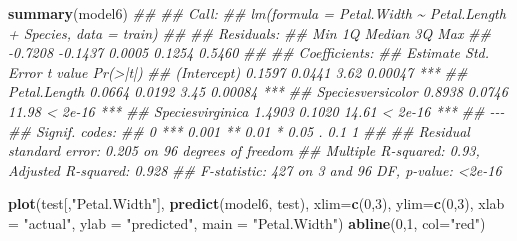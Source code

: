 \documentclass[
  notitlepage]{book}
\newenvironment{Shaded}{\begin{snugshade}}{\end{snugshade}}
\newcommand{\CommentTok}[1]{\textcolor[rgb]{0.56,0.35,0.01}{\textit{#1}}}
\newcommand{\DataTypeTok}[1]{\textcolor[rgb]{0.13,0.29,0.53}{#1}}
\newcommand{\DecValTok}[1]{\textcolor[rgb]{0.00,0.00,0.81}{#1}}
\newcommand{\KeywordTok}[1]{\textcolor[rgb]{0.13,0.29,0.53}{\textbf{#1}}}
\newcommand{\NormalTok}[1]{#1}
\newcommand{\OperatorTok}[1]{\textcolor[rgb]{0.81,0.36,0.00}{\textbf{#1}}}
\newcommand{\StringTok}[1]{\textcolor[rgb]{0.31,0.60,0.02}{#1}}
\begin{document}
\begin{Shaded}
\begin{Highlighting}[]
\KeywordTok{summary}\NormalTok{(model6)}
\CommentTok{\#\# }
\CommentTok{\#\# Call:}
\CommentTok{\#\# lm(formula = Petal.Width \textasciitilde{} Petal.Length + Species, data = train)}
\CommentTok{\#\# }
\CommentTok{\#\# Residuals:}
\CommentTok{\#\#     Min      1Q  Median      3Q     Max }
\CommentTok{\#\# {-}0.7208 {-}0.1437  0.0005  0.1254  0.5460 }
\CommentTok{\#\# }
\CommentTok{\#\# Coefficients:}
\CommentTok{\#\#                   Estimate Std. Error t value Pr(\textgreater{}|t|)    }
\CommentTok{\#\# (Intercept)         0.1597     0.0441    3.62  0.00047 ***}
\CommentTok{\#\# Petal.Length        0.0664     0.0192    3.45  0.00084 ***}
\CommentTok{\#\# Speciesversicolor   0.8938     0.0746   11.98  \textless{} 2e{-}16 ***}
\CommentTok{\#\# Speciesvirginica    1.4903     0.1020   14.61  \textless{} 2e{-}16 ***}
\CommentTok{\#\# {-}{-}{-}}
\CommentTok{\#\# Signif. codes:  }
\CommentTok{\#\# 0 \textquotesingle{}***\textquotesingle{} 0.001 \textquotesingle{}**\textquotesingle{} 0.01 \textquotesingle{}*\textquotesingle{} 0.05 \textquotesingle{}.\textquotesingle{} 0.1 \textquotesingle{} \textquotesingle{} 1}
\CommentTok{\#\# }
\CommentTok{\#\# Residual standard error: 0.205 on 96 degrees of freedom}
\CommentTok{\#\# Multiple R{-}squared:  0.93,   Adjusted R{-}squared:  0.928 }
\CommentTok{\#\# F{-}statistic:  427 on 3 and 96 DF,  p{-}value: \textless{}2e{-}16}
\end{Highlighting}
\end{Shaded}

\begin{Shaded}
\end{Shaded}

\begin{Shaded}
\begin{Highlighting}[]
\KeywordTok{plot}\NormalTok{(test[,}\StringTok{"Petal.Width"}\NormalTok{], }\KeywordTok{predict}\NormalTok{(model6, test),}
  \DataTypeTok{xlim=}\KeywordTok{c}\NormalTok{(}\DecValTok{0}\NormalTok{,}\DecValTok{3}\NormalTok{), }\DataTypeTok{ylim=}\KeywordTok{c}\NormalTok{(}\DecValTok{0}\NormalTok{,}\DecValTok{3}\NormalTok{), }
  \DataTypeTok{xlab =} \StringTok{"actual"}\NormalTok{, }\DataTypeTok{ylab =} \StringTok{"predicted"}\NormalTok{,}
  \DataTypeTok{main =} \StringTok{"Petal.Width"}\NormalTok{)}
\KeywordTok{abline}\NormalTok{(}\DecValTok{0}\NormalTok{,}\DecValTok{1}\NormalTok{, }\DataTypeTok{col=}\StringTok{"red"}\NormalTok{)}
\end{Highlighting}
\end{Shaded}
\end{document}
